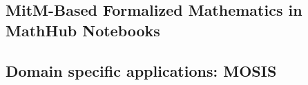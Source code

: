 \subsection{MitM-Based Formalized Mathematics in MathHub Notebooks}

\subsection{Domain specific applications: MOSIS}


